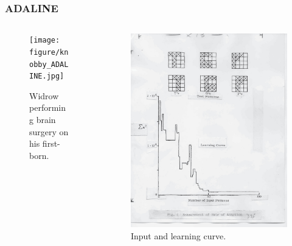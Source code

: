 \documentclass{beamer}
\begin{document}
\begin{frame}
\frametitle{ADALINE}
\begin{columns}
    \begin{column}{0.5\textwidth}
        \begin{figure}[t]
            \texttt{[image: figure/knobby\_ADALINE.jpg]}
            \centering
            \caption{Widrow performing brain surgery on his first-born.}
        \end{figure}
    \end{column}
    \begin{column}{0.5\textwidth}
        \begin{figure}[t]
            \includegraphics[width=\textwidth]{figure/ADALINE_learning_curve.png}
            \centering
            \caption{Input and learning curve.}
        \end{figure}
    \end{column}
\end{columns}
\end{frame}
\end{document}
